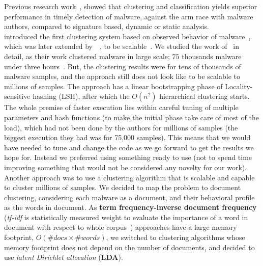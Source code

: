 Previous research work~\cite[]{bailey,bayer,rieck2009automatic}, showed that clustering and classification yields superior performance in timely detection of malware, against the arm race with malware authors, compared to signature based, dynamic or static analysis.
\\
\citeauthor{bailey} introduced the first clustering system based on observed behavior of malware~\cite[]{bailey}, which was later extended by~\citeauthor{bayer}~\cite[]{bayer}, to be scalable~\cite[]{rieck2009automatic}.
We studied the work of~\citeauthor{bayer} in detail, as their work clustered malware in large scale; $75$ thousands malware under three hours~\cite[]{bayer}.
But, the clustering results were for tens of thousands of malware samples, and the approach still does not look like to be scalable to millions of samples.
The approach has a linear bootstrapping phase of Locality-sensitive hashing (LSH), after which the $O(n^2)$ hierarchical clustering starts.
The whole premise of faster execution lies within careful tuning of multiple parameters and hash functions (to make the initial phase take care of most of the load), which had not been done by the authors for millions of samples (the biggest execution they had was for 75,000 samples).
This means that we would have needed to tune and change the code as we go forward to get the results we hope for.
Instead we preferred using something ready to use (not to spend time improving something that would not be considered any novelty for our work).
\\
Another approach was to use a clustering algorithm that is scalable and capable to cluster millions of samples.
We decided to map the problem to document clustering, considering each malware as a document, and their behavioral profile as the words in document.
As \textbf{term frequency-inverse document frequency} (\emph{tf-idf} is statistically measured weight to evaluate the importance of a word in document with respect to whole corpus~\cite[]{tfidf}) approaches have a large memory footprint, $O(\#docs \times \#words)$, we switched to clustering algorithms whose memory footprint does not depend on the number of documents, and decided to use \textit{latent Dirichlet allocation} (\textbf{LDA}).
